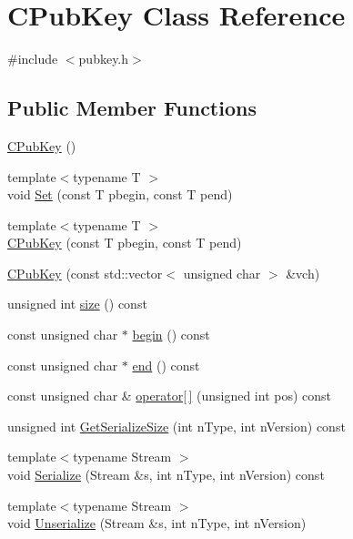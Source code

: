\hypertarget{class_c_pub_key}{}\section{C\+Pub\+Key Class Reference}
\label{class_c_pub_key}


{\ttfamily \#include $<$pubkey.\+h$>$}

\subsection*{Public Member Functions}
\begin{DoxyCompactItemize}
\item 
\hyperlink{class_c_pub_key_a468f3aef3555d12ede19c0d8dc88c13a}{C\+Pub\+Key} ()
\item 
{\footnotesize template$<$typename T $>$ }\\void \hyperlink{class_c_pub_key_af59bc1d3be119c1f8b49d3c1e2c0797b}{Set} (const T pbegin, const T pend)
\item 
{\footnotesize template$<$typename T $>$ }\\\hyperlink{class_c_pub_key_a8c7527b40c96bfb8f48b669764301df8}{C\+Pub\+Key} (const T pbegin, const T pend)
\item 
\hyperlink{class_c_pub_key_a31307d0318ebda95c7e34ef1554fe2d2}{C\+Pub\+Key} (const std\+::vector$<$ unsigned char $>$ \&vch)
\item 
unsigned int \hyperlink{class_c_pub_key_a9d7129b65b6dee792b4f3923cd64ed59}{size} () const 
\item 
const unsigned char $\ast$ \hyperlink{class_c_pub_key_add9987e0d25aff11181f5ad70413994b}{begin} () const 
\item 
const unsigned char $\ast$ \hyperlink{class_c_pub_key_aa559d2a4f2cbdec84c02a4adc18fa657}{end} () const 
\item 
const unsigned char \& \hyperlink{class_c_pub_key_a70df86158a27670eb4566ca0c587cdec}{operator\mbox{[}$\,$\mbox{]}} (unsigned int pos) const 
\item 
unsigned int \hyperlink{class_c_pub_key_a71ca590df9b99faaf1604f826d2c8807}{Get\+Serialize\+Size} (int n\+Type, int n\+Version) const 
\item 
{\footnotesize template$<$typename Stream $>$ }\\void \hyperlink{class_c_pub_key_a315865ee4c45726c01fae44d53b180a1}{Serialize} (Stream \&s, int n\+Type, int n\+Version) const 
\item 
{\footnotesize template$<$typename Stream $>$ }\\void \hyperlink{class_c_pub_key_a1cfd8e3c711f5298eecdacd5979f6e6c}{Unserialize} (Stream \&s, int n\+Type, int n\+Version)

\end{DoxyCompactItemize}
